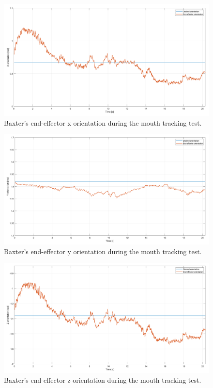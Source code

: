 \documentclass[11pt]{report} %
\begin{document}
\begin{figure}[H]
    \centering
    \includegraphics[width=1.0\linewidth]{assets/imgs/control_theory/mpc_tracking/x_orientation.png}
    \caption{Baxter's end-effector x orientation during the mouth tracking test.} 
    \label{fig_baxter_x_orientation_mpc_tracking_experiments}
\end{figure}

\begin{figure}[H]
    \centering
    \includegraphics[width=1.0\linewidth]{assets/imgs/control_theory/mpc_tracking/y_orientation.png}
    \caption{Baxter's end-effector y orientation during the mouth tracking test.} 
    \label{fig_baxter_y_orientation_mpc_tracking_experiments}
\end{figure}

\begin{figure}[H]
    \centering
    \includegraphics[width=1.0\linewidth]{assets/imgs/control_theory/mpc_tracking/z_orientation.png}
    \caption{Baxter's end-effector z orientation during the mouth tracking test.} 
    \label{fig_baxter_z_orientation_mpc_tracking_experiments}
\end{figure}
\end{document}
